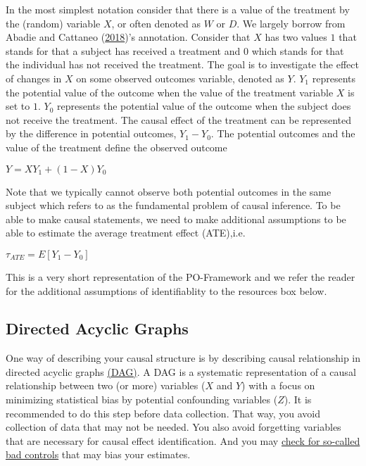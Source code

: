 \documentclass[
]{book}
\begin{document}
In the most simplest notation consider that there is a value of the
treatment by the (random) variable \(X\), or often denoted as \(W\) or
\(D\). We largely borrow from Abadie and Cattaneo
(\protect\hyperlink{ref-abadie_econometric_2018}{2018})'s annotation.
Consider that \(X\) has two values \(1\) that stands for that a subject
has received a treatment and \(0\) which stands for that the individual
has not received the treatment. The goal is to investigate the effect of
changes in \(X\) on some observed outcomes variable, denoted as \(Y\).
\(Y_1\) represents the potential value of the outcome when the value of
the treatment variable \(X\) is set to \(1\). \(Y_0\) represents the
potential value of the outcome when the subject does not receive the
treatment. The causal effect of the treatment can be represented by the
difference in potential outcomes, \(Y_1-Y_0\). The potential outcomes
and the value of the treatment define the observed outcome

\(Y=XY_1+(1-X)Y_0\)

Note that we typically cannot observe both potential outcomes in the
same subject which refers to as the fundamental problem of causal
inference. To be able to make causal statements, we need to make
additional assumptions to be able to estimate the average treatment
effect (ATE),i.e.

\(\tau_{ATE}=E[Y_1-Y_0]\)

This is a very short representation of the PO-Framework and we refer the
reader for the additional assumptions of identifiablity to the resources
box below.

\hypertarget{directed-acyclic-graphs}{%
\subsection{Directed Acyclic Graphs}\label{directed-acyclic-graphs}}

One way of describing your causal structure is by describing causal
relationship in directed acyclic graphs
\href{https://cran.r-project.org/web/packages/ggdag/vignettes/intro-to-dags.html}{(DAG)}.
A DAG is a systematic representation of a causal relationship between
two (or more) variables (\(X\) and \(Y\)) with a focus on minimizing
statistical bias by potential confounding variables (\(Z\)). It is
recommended to do this step before data collection. That way, you avoid
collection of data that may not be needed. You also avoid forgetting
variables that are necessary for causal effect identification. And you
may \href{https://ftp.cs.ucla.edu/pub/stat_ser/r493.pdf}{check for
so-called bad controls} that may bias your estimates.
\end{document}

